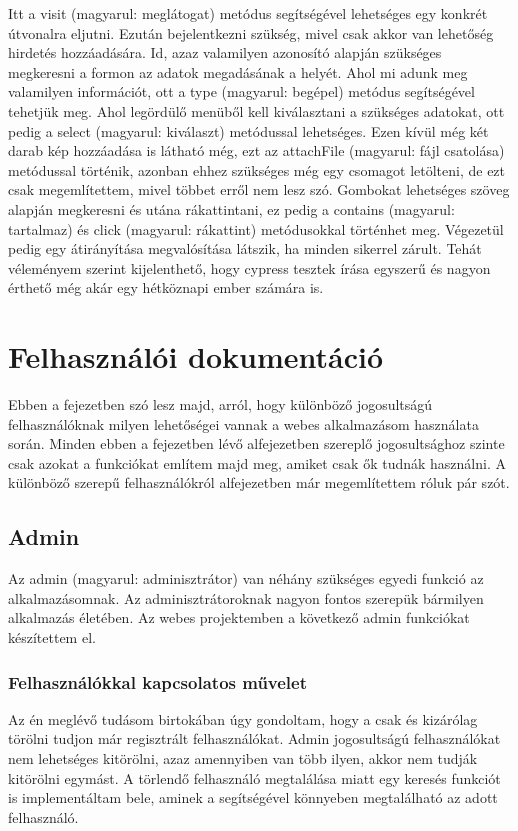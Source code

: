 \documentclass[]{thesis-ekf}
\theoremstyle{definition}
\theoremstyle{remark}
\begin{document}
		Itt a visit (magyarul: meglátogat) metódus segítségével lehetséges egy konkrét útvonalra eljutni. Ezután bejelentkezni szükség, mivel csak akkor van lehetőség hirdetés hozzáadására. Id, azaz valamilyen azonosító alapján szükséges megkeresni a formon az adatok megadásának a helyét. Ahol mi adunk meg valamilyen információt, ott a type (magyarul: begépel) metódus segítségével tehetjük meg. Ahol legördülő menüből kell kiválasztani a szükséges adatokat, ott pedig a select (magyarul: kiválaszt) metódussal lehetséges. Ezen kívül még két darab kép hozzáadása is látható még, ezt az attachFile (magyarul: fájl csatolása) metódussal történik, azonban ehhez szükséges még egy csomagot letölteni, de ezt csak megemlítettem, mivel többet erről nem lesz szó. Gombokat lehetséges szöveg alapján megkeresni és utána rákattintani, ez pedig a contains (magyarul: tartalmaz) és click (magyarul: rákattint) metódusokkal történhet meg. Végezetül pedig egy átirányítása megvalósítása látszik, ha minden sikerrel zárult. Tehát véleményem szerint kijelenthető, hogy cypress tesztek írása egyszerű és nagyon érthető még akár egy hétköznapi ember számára is.
		
	\chapter{Felhasználói dokumentáció}
		Ebben a fejezetben szó lesz majd, arról, hogy különböző jogosultságú felhasználóknak milyen lehetőségei vannak a webes alkalmazásom használata során. Minden ebben a fejezetben lévő alfejezetben szereplő jogosultsághoz szinte csak azokat a funkciókat említem majd meg, amiket csak ők tudnák használni. A különböző szerepű felhasználókról \az{\ref{sc-plantuml}} alfejezetben már megemlítettem róluk pár szót.
	\section{Admin}
		Az admin (magyarul: adminisztrátor) van néhány szükséges egyedi funkció az alkalmazásomnak. Az adminisztrátoroknak nagyon fontos szerepük bármilyen alkalmazás életében. Az webes projektemben a következő admin funkciókat készítettem el.
	\subsection{Felhasználókkal kapcsolatos művelet}
		Az én meglévő tudásom birtokában úgy gondoltam, hogy a csak és kizárólag törölni tudjon már regisztrált felhasználókat. Admin jogosultságú felhasználókat nem lehetséges kitörölni, azaz amennyiben van több ilyen, akkor nem tudják kitörölni egymást. A törlendő felhasználó megtalálása miatt egy keresés funkciót is implementáltam bele, aminek a segítségével könnyeben megtalálható az adott felhasználó.
\end{document}
